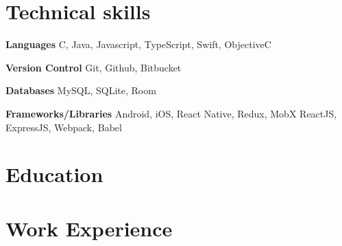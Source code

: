 \documentclass[11pt,a4paper]{moderncv}
\begin{document}
\maketitle

\section{Technical skills}
    \textbf{Languages}
           {C, Java, Javascript, TypeScript, Swift, ObjectiveC}

    \textbf{Version Control}
           {Git, Github, Bitbucket}

    \textbf{Databases}
           {MySQL, SQLite, Room}

    \textbf{Frameworks/Libraries}
           {Android, iOS, React Native, Redux, MobX}
           {ReactJS, ExpressJS, Webpack, Babel}

\section{Education}

\section{Work Experience}
\end{document}
